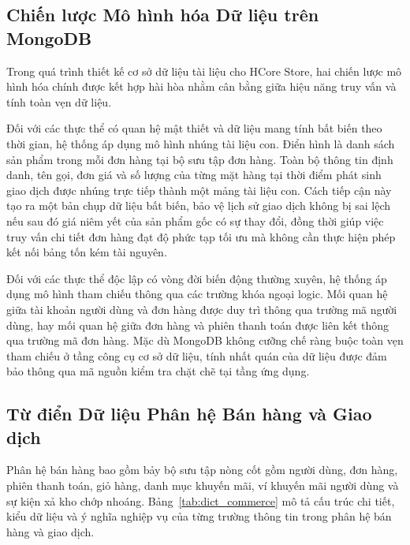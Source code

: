 \subsection{Chiến lược Mô hình hóa Dữ liệu trên MongoDB}
Trong quá trình thiết kế cơ sở dữ liệu tài liệu cho HCore Store, hai chiến lược mô hình hóa chính được kết hợp hài hòa nhằm cân bằng giữa hiệu năng truy vấn và tính toàn vẹn dữ liệu.

Đối với các thực thể có quan hệ mật thiết và dữ liệu mang tính bất biến theo thời gian, hệ thống áp dụng mô hình nhúng tài liệu con. Điển hình là danh sách sản phẩm trong mỗi đơn hàng tại bộ sưu tập đơn hàng. Toàn bộ thông tin định danh, tên gọi, đơn giá và số lượng của từng mặt hàng tại thời điểm phát sinh giao dịch được nhúng trực tiếp thành một mảng tài liệu con. Cách tiếp cận này tạo ra một bản chụp dữ liệu bất biến, bảo vệ lịch sử giao dịch không bị sai lệch nếu sau đó giá niêm yết của sản phẩm gốc có sự thay đổi, đồng thời giúp việc truy vấn chi tiết đơn hàng đạt độ phức tạp tối ưu mà không cần thực hiện phép kết nối bảng tốn kém tài nguyên.

Đối với các thực thể độc lập có vòng đời biến động thường xuyên, hệ thống áp dụng mô hình tham chiếu thông qua các trường khóa ngoại logic. Mối quan hệ giữa tài khoản người dùng và đơn hàng được duy trì thông qua trường mã người dùng, hay mối quan hệ giữa đơn hàng và phiên thanh toán được liên kết thông qua trường mã đơn hàng. Mặc dù MongoDB không cưỡng chế ràng buộc toàn vẹn tham chiếu ở tầng công cụ cơ sở dữ liệu, tính nhất quán của dữ liệu được đảm bảo thông qua mã nguồn kiểm tra chặt chẽ tại tầng ứng dụng.

\subsection{Từ điển Dữ liệu Phân hệ Bán hàng và Giao dịch}
Phân hệ bán hàng bao gồm bảy bộ sưu tập nòng cốt gồm người dùng, đơn hàng, phiên thanh toán, giỏ hàng, danh mục khuyến mãi, ví khuyến mãi người dùng và sự kiện xả kho chớp nhoáng. Bảng~\ref{tab:dict_commerce} mô tả cấu trúc chi tiết, kiểu dữ liệu và ý nghĩa nghiệp vụ của từng trường thông tin trong phân hệ bán hàng và giao dịch.

